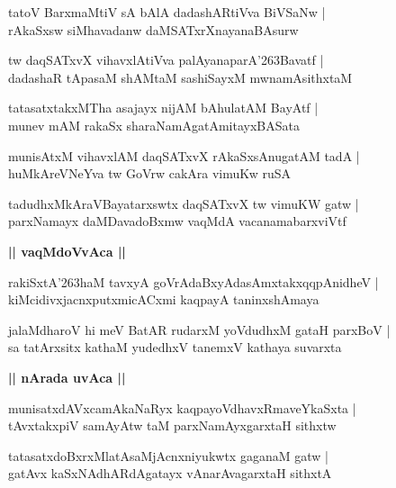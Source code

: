 \documentclass[twoside,12pt,openright]{book}
\def\S{\char'263}
\newcounter{shloka}[chapter]
\def\uvaca#1{\centerline{{\large\textbf{#1}}}}
\begin{document}
\begin{shloka}%
tatoV BarxmaMtiV sA bAlA dadashARtiVva BiVSaNw |\\
rAkaSxsw siMhavadanw daMSATxrXnayanaBAsurw
\end{shloka}

\begin{shloka}%
tw daqSATxvX vihavxlAtiVva palAyanaparA\S Bavatf |\\
dadashaR tApasaM shAMtaM sashiSayxM mwnamAsithxtaM 
\end{shloka}

\begin{shloka}%
tatasatxtakxMTha asajayx nijAM bAhulatAM BayAtf |\\
munev mAM rakaSx sharaNamAgatAmitayxBASata
\end{shloka}

\begin{shloka}%
munisAtxM vihavxlAM daqSATxvX rAkaSxsAnugatAM tadA |\\
huMkAreVNeYva tw GoVrw cakAra vimuKw ruSA 
\end{shloka}

\begin{shloka}%
tadudhxMkAraVBayatarxswtx daqSATxvX tw vimuKW gatw |\\
parxNamayx daMDavadoBxmw vaqMdA vacanamabarxviVtf
\end{shloka}

\uvaca{|| vaqMdoVvAca ||}

\begin{shloka}%
rakiSxtA\S haM tavxyA goVrAdaBxyAdasAmxtakxqqpAnidheV |\\
kiMcidivxjacnxputxmicACxmi kaqpayA taninxshAmaya
\end{shloka}

\begin{shloka}%
jalaMdharoV hi meV BatAR rudarxM yoVdudhxM gataH parxBoV |\\
sa tatArxsitx kathaM yudedhxV tanemxV kathaya suvarxta
\end{shloka}

\uvaca{|| nArada uvAca ||}

\begin{shloka}%
munisatxdAVxcamAkaNaRyx kaqpayoVdhavxRmaveYkaSxta |\\
tAvxtakxpiV samAyAtw taM parxNamAyxgarxtaH sithxtw 
\end{shloka}

\begin{shloka}%
tatasatxdoBxrxMlatAsaMjAcnxniyukwtx gaganaM gatw |\\
gatAvx kaSxNAdhARdAgatayx vAnarAvagarxtaH sithxtA
\end{shloka}
\end{document}
